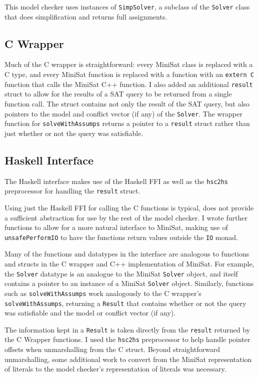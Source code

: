 \documentclass[12pt,a4paper,twoside,openright]{report}
\begin{document}
This model checker uses instances of \verb,SimpSolver,, a subclass of the \verb,Solver, class
that does simplification and returns full assignments.

\subsection{C Wrapper}

Much of the C wrapper is straightforward: every MiniSat class is replaced with a C type,
and every MiniSat function is replaced with a function with an \verb,extern C, function that
calls the MiniSat C++ function.
I also added an additional \verb,result, struct to allow for the results of a SAT query to
be returned from a single function call. The struct contains not only the result of the SAT
query, but also pointers to the model and conflict vector (if any) of the \verb,Solver,.
The wrapper function for \verb,solveWithAssumps, returns a pointer to a \verb,result, struct
rather than just whether or not the query was satisfiable.

\subsection{Haskell Interface}

The Haskell interface makes use of the Haskell FFI as well as the \verb,hsc2hs, preprocessor
for handling the \verb,result, struct.

Using just the Haskell FFI for calling the C functions is typical, does not provide a sufficient
abstraction for use by the rest of the model checker. I wrote further functions to allow for a more 
natural interface to MiniSat, making use of \verb,unsafePerformIO, to have the functions return
values outside the \verb,IO, monad.

Many of the functions and datatypes in the interface are analogous to functions and structs in
the C wrapper and C++ implementation of MiniSat. For example, the \verb,Solver, datatype is an
analogue to the MiniSat \verb,Solver, object, and itself contains a pointer to an instance of
a MiniSat \verb,Solver, object. Similarly, functions such as \verb,solveWithAssumps, work
analogously to the C wrapper's \verb,solveWithAssumps,, returning a \verb,Result, that contains
whether or not the query was satisfiable and the model or conflict vector (if any).

The information kept in a \verb,Result, is taken directly from the \verb,result, returned by
the C Wrapper functions. I used the \verb,hsc2hs, preprocessor to help handle pointer offsets
when unmarshalling from the C struct. Beyond straightforward unmarshalling, some additional work
to convert from the MiniSat representation of literals to the model checker’s representation of
literals was necessary.
\end{document}
